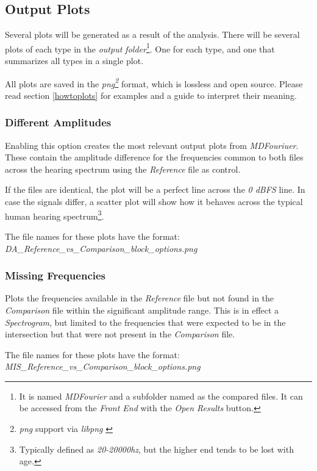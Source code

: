 \documentclass[10pt,a4paper]{report}
\newcommand{\defineCite}[2]{
	\textit{\acrshort{#1}\footnote{\textit{\acrlong{#1}} #2}}}
\begin{document}
\begin{appendices}
\subsection{Output Plots}
\label{outputfiles}

Several plots will be generated as a result of the analysis. There will be several plots of each type in the \textit{output folder}\footnote{It is named \textit{MDFourier} and a subfolder named as the compared files. It can be accessed from the \textit{Front End} with the \textit{Open Results} button.}. One for each type, and one that summarizes all types in a single plot.

All plots are saved in the \defineCite{png}{support via \textit{libpng} \cite{libpng}} format, which is lossless and open source. Please read section \ref{howtoplots} for examples and a guide to interpret their meaning. 

\subsubsection{Different Amplitudes}

Enabling this option creates the most relevant output plots from \textit{MDFouriuer}. These contain the amplitude difference for the frequencies common to both files across the hearing spectrum using the \textit{Reference} file as control.

If the files are identical, the plot will be a perfect line across the \textit{0 dBFS} line. In case the signals differ, a scatter plot will show how it behaves across the typical human hearing spectrum\footnote{Typically defined as \textit{20-20000hz}, but the higher end tends to be lost with age.}.

The file names for these plots have the format:\\ \textit{DA\_Reference\_vs\_Comparison\_block\_options.png}

\subsubsection{Missing Frequencies} 

Plots the frequencies available in the \textit{Reference} file but not found in the \textit{Comparison} file within the significant amplitude range. This is in effect a \textit{Spectrogram}, but limited to the frequencies that were expected to be in the intersection but that were not present in the \textit{Comparison} file.

The file names for these plots have the format:\\ \textit{MIS\_Reference\_vs\_Comparison\_block\_options.png}


\end{appendices}
\end{document}
